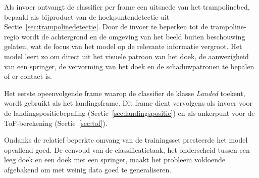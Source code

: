 Als invoer ontvangt de classifier per frame een uitsnede van het trampolinebed, bepaald als bijproduct van de hoekpuntendetectie uit Sectie~\ref{sec:trampolinedetectie}. Door de invoer te beperken tot de trampoline-regio wordt de achtergrond en de omgeving van het beeld buiten beschouwing gelaten, wat de focus van het model op de relevante informatie vergroot. Het model leert zo om direct uit het visuele patroon van het doek, de aanwezigheid van een springer, de vervorming van het doek en de schaduwpatronen te bepalen of er contact is.

Het eerste opeenvolgende frame waarop de classifier de klasse \textit{Landed} toekent, wordt gebruikt als het landingsframe. Dit frame dient vervolgens als invoer voor de landingspositiebepaling (Sectie~\ref{sec:landingspositie}) en als ankerpunt voor de ToF-berekening (Sectie~\ref{sec:tof}).

Ondanks de relatief beperkte omvang van de trainingsset presteerde het model opvallend goed. De eenvoud van de classificatietaak, het onderscheid tussen een leeg doek en een doek met een springer, maakt het probleem voldoende afgebakend om met weinig data goed te generaliseren.
